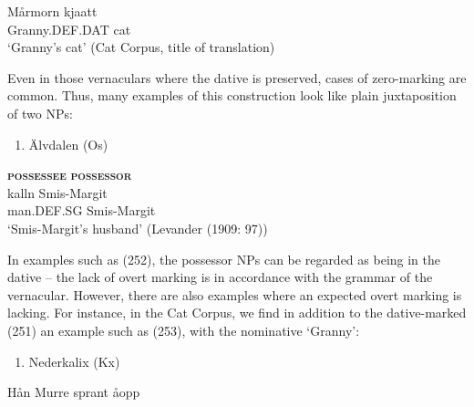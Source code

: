 \ea\label{}
\gll Mårmorn  kjaatt\\


Granny.DEF.DAT  cat\\ %


‘Granny’s cat’ (Cat Corpus, title of translation)
\z


Even in those vernaculars where the dative is preserved, cases of zero-marking are common. Thus, many examples of this construction look like plain juxtaposition of two NPs:

\begin{enumerate} %
\item 
\label{bkm:Ref134419452}Älvdalen (Os)

\end{enumerate} %
\ea\label{}
\gll \textbf{\textsc{possessee}} \textbf{\textsc{possessor}} \\


\ea\label{}
\gll kalln  Smis-Margit \\


man.DEF.SG  Smis-Margit\\ %


‘Smis-Margit’s husband’ (Levander (1909: 97))
\z

In examples such as (252), the possessor NPs can be regarded as being in the dative – the lack of overt marking is in accordance with the grammar of the vernacular. However, there are also examples where an expected overt marking is lacking. For instance, in the Cat Corpus, we find in addition to the dative-marked (251) an example such as (253), with the nominative  ‘Granny’: 

\begin{enumerate} %
\item 
\label{bkm:Ref110681866}Nederkalix (Kx)

\end{enumerate} %
\ea\label{}
\gll Hån  Murre  sprant  åopp\\


